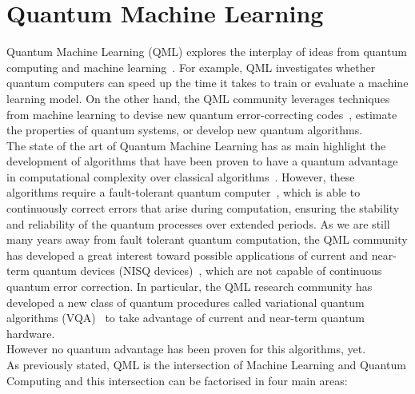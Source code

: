 \chapter{Quantum Machine Learning}

Quantum Machine Learning (QML) explores the interplay of ideas from quantum computing and
machine learning~\cite{Biamonte_2017}.
For example, QML investigates whether quantum computers can speed up the time it takes
to train or evaluate a machine learning model. On the other hand, the QML community
leverages techniques from machine learning to devise new quantum error-correcting codes~\cite{Roffe_2019}, 
estimate the properties of quantum systems, or develop new quantum algorithms.\\



The state of the art of Quantum Machine Learning has as main highlight the development
of algorithms that have been proven to have a quantum advantage in computational
complexity over classical algorithms~\cite{Sweke_2021, Liu_2021, Jerbi_2021}.
However, these algorithms require a fault-tolerant quantum computer~\cite{shor}, which is able to
continuously correct errors that arise during computation, ensuring the stability and
reliability of the quantum processes over extended periods.
As we are still many years away from fault tolerant quantum computation, the QML
community has developed a great interest toward possible applications of current and
near-term quantum devices (NISQ devices)~\cite{Preskill_2018}, which are not capable of continuous
quantum error correction.
In particular, the QML research community has developed a new class of quantum
procedures called variational quantum algorithms (VQA)~\cite{Cerezo_2021} to take advantage of current
and near-term quantum hardware.\\
However no quantum advantage has been proven for this algorithms, yet.\\

As previously stated, QML is the intersection of Machine Learning and Quantum Computing and this intersection can be 
factorised in four main areas:


